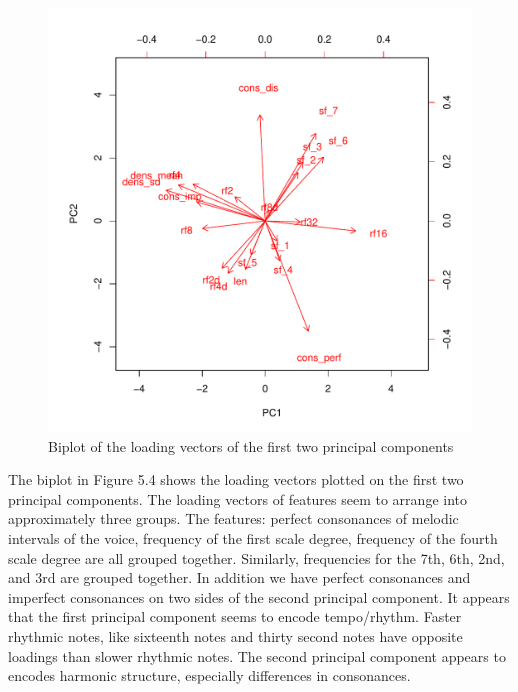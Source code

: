 \documentclass[12pt,twoside]{reedthesis}
\theoremstyle{definition}
\theoremstyle{definition}
\theoremstyle{definition}
\theoremstyle{remark}
\begin{document}
\begin{figure}[H]
\centering
\includegraphics[scale = .5]{images/biplot_b.pdf}
\caption{Biplot of the loading vectors of the first two principal components}
\label{subd}
\end{figure}
The biplot in Figure 5.4 shows the loading vectors plotted on the first
two principal components. The loading vectors of features seem to
arrange into approximately three groups. The features: perfect
consonances of melodic intervals of the voice, frequency of the first
scale degree, frequency of the fourth scale degree are all grouped
together. Similarly, frequencies for the 7th, 6th, 2nd, and 3rd are
grouped together. In addition we have perfect consonances and imperfect
consonances on two sides of the second principal component. It appears
that the first principal component seems to encode tempo/rhythm. Faster
rhythmic notes, like sixteenth notes and thirty second notes have
opposite loadings than slower rhythmic notes. The second principal
component appears to encodes harmonic structure, especially differences
in consonances.
\end{document}
